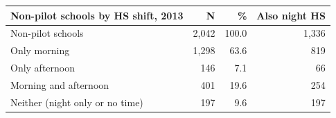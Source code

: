 
\begin{tabular}{lrrr}
\toprule
Non-pilot schools by HS shift, 2013 & N & \% & Also night HS\\
\midrule
Non-pilot schools & 2,042 & 100.0 & 1,336\\
Only morning & 1,298 & 63.6 & 819\\
Only afternoon & 146 & 7.1 & 66\\
Morning and afternoon & 401 & 19.6 & 254\\
Neither (night only or no time) & 197 & 9.6 & 197\\
\bottomrule
\end{tabular}
